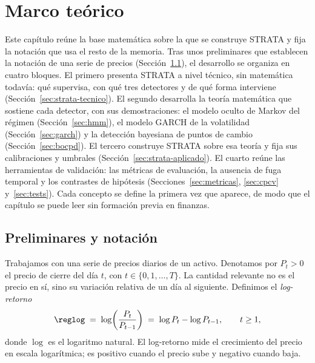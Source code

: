 \chapter{Marco teórico}
\label{cap:marco-teorico}


Este capítulo reúne la base matemática sobre la que se construye STRATA y fija la notación que usa el resto de la memoria. Tras unos preliminares que establecen la notación de una serie de precios (Sección~\ref{sec:preliminares}), el desarrollo se organiza en cuatro bloques. El primero presenta STRATA a nivel técnico, sin matemática todavía: qué supervisa, con qué tres detectores y de qué forma interviene (Sección~\ref{sec:strata-tecnico}). El segundo desarrolla la teoría matemática que sostiene cada detector, con sus demostraciones: el modelo oculto de Markov del régimen (Sección~\ref{sec:hmm}), el modelo GARCH de la volatilidad (Sección~\ref{sec:garch}) y la detección bayesiana de puntos de cambio (Sección~\ref{sec:bocpd}). El tercero construye STRATA sobre esa teoría y fija sus calibraciones y umbrales (Sección~\ref{sec:strata-aplicado}). El cuarto reúne las herramientas de validación: las métricas de evaluación, la ausencia de fuga temporal y los contrastes de hipótesis (Secciones~\ref{sec:metricas}, \ref{sec:cpcv} y~\ref{sec:tests}). Cada concepto se define la primera vez que aparece, de modo que el capítulo se puede leer sin formación previa en finanzas.

\section{Preliminares y notación}
\label{sec:preliminares}

Trabajamos con una serie de precios diarios de un activo. Denotamos por $P_t > 0$ el precio de cierre del día $t$, con $t \in \{0, 1, \dots, T\}$. La cantidad relevante no es el precio en sí, sino su variación relativa de un día al siguiente. Definimos el \emph{log-retorno}
\[
\reglog \;=\; \log\!\left(\frac{P_t}{P_{t-1}}\right) \;=\; \log P_t - \log P_{t-1}, \qquad t \ge 1,
\]
donde $\log$ es el logaritmo natural. El log-retorno mide el crecimiento del precio en escala logarítmica; es positivo cuando el precio sube y negativo cuando baja.

